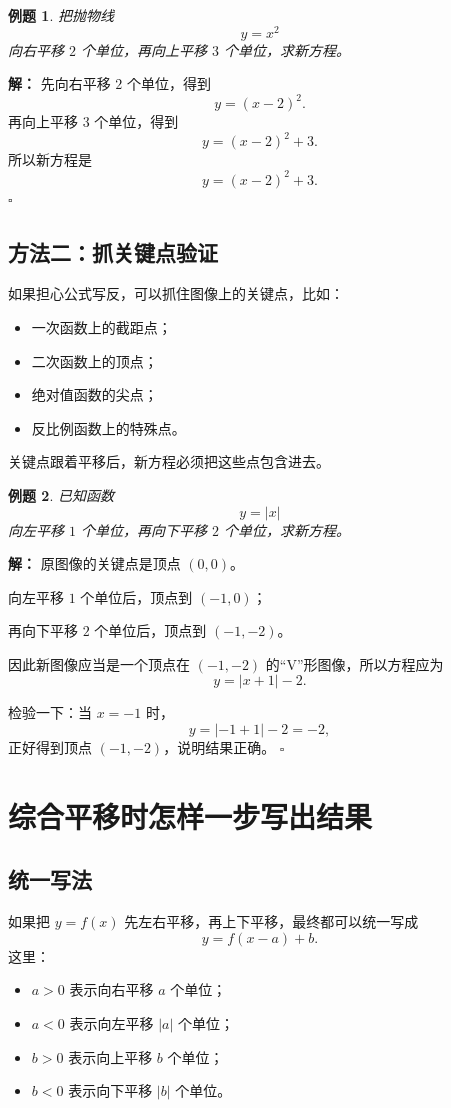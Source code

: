 \documentclass[11pt,a4paper,fontset=fandol]{ctexart}
\theoremstyle{formaltheorem}
\theoremstyle{formalexample}
\newtheorem{example}{例题}[section]
\newenvironment{solution}{\par\noindent\textbf{解：}}{\hfill$\square$\par}
\newcommand{\basef}{y=f(x)}
\begin{document}
\begin{example}
把抛物线
\[
y=x^2
\]
向右平移 $2$ 个单位，再向上平移 $3$ 个单位，求新方程。
\end{example}

\begin{solution}
先向右平移 $2$ 个单位，得到
\[
y=(x-2)^2.
\]
再向上平移 $3$ 个单位，得到
\[
y=(x-2)^2+3.
\]
所以新方程是
\[
\boxed{y=(x-2)^2+3}.
\]
\end{solution}

\subsection{方法二：抓关键点验证}
如果担心公式写反，可以抓住图像上的关键点，比如：
\begin{itemize}
  \item 一次函数上的截距点；
  \item 二次函数上的顶点；
  \item 绝对值函数的尖点；
  \item 反比例函数上的特殊点。
\end{itemize}
关键点跟着平移后，新方程必须把这些点包含进去。

\begin{example}
已知函数
\[
y=|x|
\]
向左平移 $1$ 个单位，再向下平移 $2$ 个单位，求新方程。
\end{example}

\begin{solution}
原图像的关键点是顶点 $(0,0)$。

向左平移 $1$ 个单位后，顶点到 $( -1,0 )$；

再向下平移 $2$ 个单位后，顶点到 $( -1,-2 )$。

因此新图像应当是一个顶点在 $( -1,-2 )$ 的“V”形图像，所以方程应为
\[
y=|x+1|-2.
\]

检验一下：当 $x=-1$ 时，
\[
y=|-1+1|-2=-2,
\]
正好得到顶点 $( -1,-2 )$，说明结果正确。
\end{solution}

\section{综合平移时怎样一步写出结果}

\subsection{统一写法}
如果把 $\basef$ 先左右平移，再上下平移，最终都可以统一写成
\[
y=f(x-a)+b.
\]
这里：
\begin{itemize}
  \item $a>0$ 表示向右平移 $a$ 个单位；
  \item $a<0$ 表示向左平移 $|a|$ 个单位；
  \item $b>0$ 表示向上平移 $b$ 个单位；
  \item $b<0$ 表示向下平移 $|b|$ 个单位。
\end{itemize}
\end{document}
